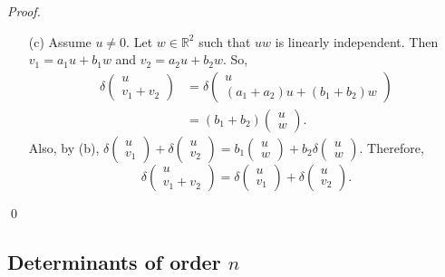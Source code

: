 \documentclass[12pt]{article}
\newenvironment{sol}
    {\emph{Proof.}
    }
    {
    \qed
    }
\begin{document}
\begin{sol}
\begin{itemize}
    \item[(c)] Assume $u \neq 0$. Let $w \in \mathbb{R}^2$ such that $uw$ is linearly independent. Then $v_1 = a_1u + b_1w$ and $v_2 = a_2u + b_2w$. So, \begin{align*}
        \delta \begin{pmatrix}
        u \\ v_1 + v_2
        \end{pmatrix} &= \delta \begin{pmatrix}
        u \\ (a_1 + a_2)u + (b_1 + b_2)w
        \end{pmatrix} \\
        &= (b_1 + b_2)\begin{pmatrix}
        u \\ w
        \end{pmatrix}. \tag*{(by (b))}
    \end{align*} Also, by (b), $\delta \begin{pmatrix}
    u \\ v_1
    \end{pmatrix} + \delta \begin{pmatrix}
    u \\ v_2
    \end{pmatrix} = b_1 \begin{pmatrix}
    u \\ w
    \end{pmatrix} + b_2 \delta \begin{pmatrix}
    u \\ w
    \end{pmatrix}$. Therefore, $$\delta \begin{pmatrix}
        u \\ v_1 + v_2
        \end{pmatrix} = \delta \begin{pmatrix}
    u \\ v_1
    \end{pmatrix} + \delta \begin{pmatrix}
    u \\ v_2
    \end{pmatrix}.$$
\end{itemize}
\end{sol}

\subsection{Determinants of order $n$}
\end{document}
